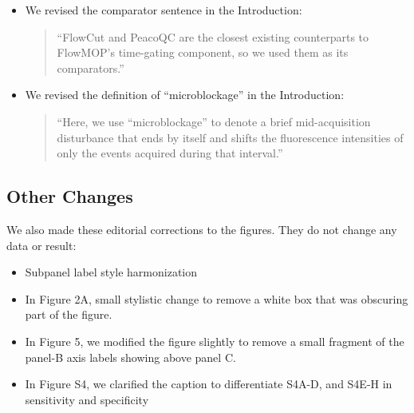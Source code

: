 \documentclass[
  11pt,
  a4paper,
]{article}
\providecommand{\tightlist}{%
  \setlength{\itemsep}{0pt}\setlength{\parskip}{0pt}}
\begin{document}
\begin{itemize}
\item
  We revised the comparator sentence in the Introduction:

  \begin{quote}
  ``FlowCut and PeacoQC are the closest existing counterparts to
  FlowMOP's time-gating component, so we used them as its comparators.''
  \end{quote}
\item
  We revised the definition of ``microblockage'' in the Introduction:

  \begin{quote}
  ``Here, we use ``microblockage'' to denote a brief mid-acquisition
  disturbance that ends by itself and shifts the fluorescence
  intensities of only the events acquired during that interval.''
  \end{quote}
\end{itemize}

\subsection{Other Changes}\label{other-changes}

We also made these editorial corrections to the figures. They do not
change any data or result:

\begin{itemize}
\tightlist
\item
  Subpanel label style harmonization
\item
  In Figure 2A, small stylistic change to remove a white box that was
  obscuring part of the figure.
\item
  In Figure 5, we modified the figure slightly to remove a small
  fragment of the panel-B axis labels showing above panel C.
\item
  In Figure S4, we clarified the caption to differentiate S4A-D, and
  S4E-H in sensitivity and specificity
\end{itemize}
\end{document}
